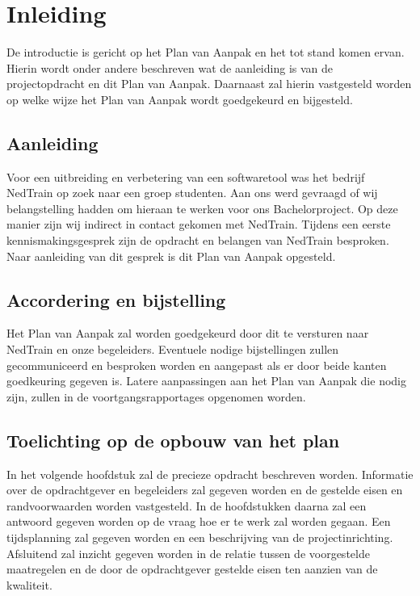 \section{Inleiding}
De introductie is gericht op het Plan van Aanpak en het tot stand komen ervan. Hierin wordt onder andere beschreven wat de aanleiding is van de projectopdracht en dit Plan van Aanpak. Daarnaast zal hierin vastgesteld worden op welke wijze het Plan van Aanpak wordt goedgekeurd en bijgesteld.\\

\subsection{Aanleiding}
Voor een uitbreiding en verbetering van een softwaretool was het bedrijf NedTrain op zoek naar een groep studenten. Aan ons werd gevraagd of wij belangstelling hadden om hieraan te werken voor ons Bachelorproject. Op deze manier zijn wij indirect in contact gekomen met NedTrain. Tijdens een eerste kennismakingsgesprek zijn de opdracht en belangen van NedTrain besproken. Naar aanleiding van dit gesprek is dit Plan van Aanpak opgesteld.\\

\subsection{Accordering en bijstelling}
Het Plan van Aanpak zal worden goedgekeurd door dit te versturen naar NedTrain en onze begeleiders. Eventuele nodige bijstellingen zullen gecommuniceerd en besproken worden en aangepast als er door beide kanten goedkeuring gegeven is. Latere aanpassingen aan het Plan van Aanpak die nodig zijn, zullen in de voortgangsrapportages opgenomen worden.\\

\subsection{Toelichting op de opbouw van het plan}
In het volgende hoofdstuk zal de precieze opdracht beschreven worden. Informatie over de opdrachtgever en begeleiders zal gegeven worden en de gestelde eisen en randvoorwaarden worden vastgesteld. In de hoofdstukken daarna zal een antwoord gegeven worden op de vraag hoe er te werk zal worden gegaan. Een tijdsplanning zal gegeven worden en een beschrijving van de projectinrichting. Afsluitend zal inzicht gegeven worden in de relatie tussen de voorgestelde maatregelen en de door de opdrachtgever gestelde eisen ten aanzien van de kwaliteit.\\